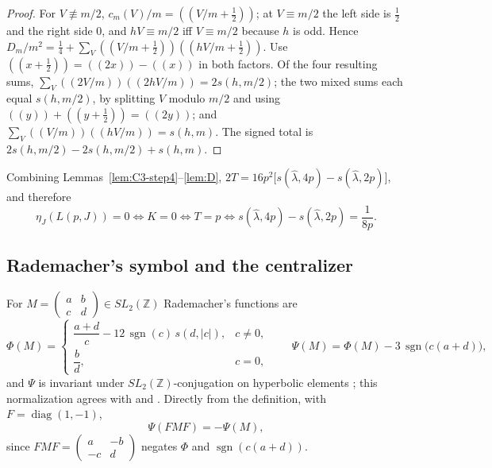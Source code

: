 \documentclass[11pt]{article}
\theoremstyle{definition}
\DeclareMathOperator{\sgn}{sgn}
\newcommand{\Z}{\mathbb Z}
\newcommand{\sawtooth}[1]{\left(\!\left(#1\right)\!\right)}
\begin{document}
\begin{proof}
For $V\not\equiv m/2$, $c_m(V)/m=\sawtooth{V/m+\tfrac12}$; at $V\equiv m/2$
the left side is $\tfrac12$ and the right side $0$, and $hV\equiv m/2$
iff $V\equiv m/2$ because $h$ is odd.  Hence
$D_m/m^2=\tfrac14+\sum_V\sawtooth{V/m+\tfrac12}\sawtooth{hV/m+\tfrac12}$.
Use $\sawtooth{x+\tfrac12}=\sawtooth{2x}-\sawtooth x$ in both factors.
Of the four resulting sums, $\sum_V\sawtooth{2V/m}\sawtooth{2hV/m}=2s(h,m/2)$;
the two mixed sums each equal $s(h,m/2)$, by splitting $V$ modulo $m/2$
and using $\sawtooth y+\sawtooth{y+\tfrac12}=\sawtooth{2y}$; and
$\sum_V\sawtooth{V/m}\sawtooth{hV/m}=s(h,m)$.  The signed total is
$2s(h,m/2)-2s(h,m/2)+s(h,m)$.
\end{proof}

Combining Lemmas~\ref{lem:C3-step4}--\ref{lem:D},
$2T=16p^2\bigl[s(\hat\lambda,4p)-s(\hat\lambda,2p)\bigr]$, and therefore
\begin{equation}
 \eta_J(L(p,J))=0\iff K=0\iff T=p\iff
 s(\hat\lambda,4p)-s(\hat\lambda,2p)=\frac1{8p}.
 \label{eq:C3-reduced}
\end{equation}

\subsection{Rademacher's symbol and the centralizer}

For $M=\begin{pmatrix}a&b\\c&d\end{pmatrix}\in SL_2(\Z)$ Rademacher's
functions are
\begin{equation}
 \Phi(M)=\begin{cases}\dfrac{a+d}c-12\,\sgn(c)\,s(d,|c|),&c\neq0,\\[6pt]
 \dfrac bd,&c=0,\end{cases}
 \qquad
 \Psi(M)=\Phi(M)-3\,\sgn\bigl(c(a+d)\bigr),
 \label{eq:rademacher-symbol}
\end{equation}
and $\Psi$ is invariant under $SL_2(\Z)$-conjugation on hyperbolic
elements \cite[Ch.~4]{RademacherGrosswald1972}; this normalization
agrees with \cite[eq.~(1.2)]{Burrin2022} and
\cite[eq.~(1.2)]{Matsusaka2024}.  Directly from the definition, with
$F=\operatorname{diag}(1,-1)$,
\begin{equation}
 \Psi(FMF)=-\Psi(M),
 \label{eq:psi-reflection}
\end{equation}
since $FMF=\begin{pmatrix}a&-b\\-c&d\end{pmatrix}$ negates $\Phi$ and
$\sgn(c(a+d))$.
\end{document}
